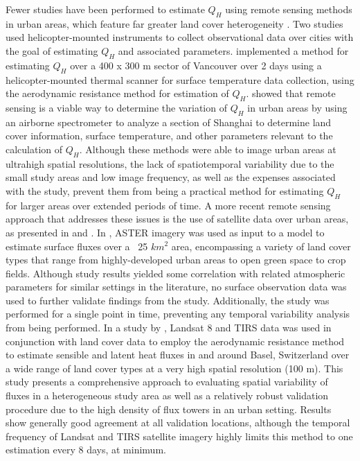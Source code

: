 Fewer studies have been performed to estimate $Q_H$ using remote sensing methods in urban areas, which feature far greater land cover heterogeneity \citep{Feigenwinter_2018, Liu_2012, Voogt_2000, Xu_2008}. Two studies \citep{Voogt_2000, Xu_2008} used helicopter-mounted instruments to collect observational data over cities with the goal of estimating $Q_H$ and associated parameters. \citet{Voogt_2000} implemented a method for estimating $Q_H$ over a 400 x 300 m sector of Vancouver over 2 days using a helicopter-mounted thermal scanner for surface temperature data collection, using the aerodynamic resistance method for estimation of $Q_H$.  \citet{Xu_2008} showed that remote sensing is a viable way to determine the variation of $Q_H$ in urban areas by using an airborne spectrometer to analyze a section of Shanghai to determine land cover information, surface temperature, and other parameters relevant to the calculation of $Q_H$.  Although these methods were able to image urban areas at ultrahigh spatial resolutions, the lack of spatiotemporal variability due to the small study areas and low image frequency, as well as the expenses associated with the study, prevent them from being a practical method for estimating $Q_H$ for larger areas over extended periods of time.  A more recent remote sensing approach that addresses these issues is the use of satellite data over urban areas, as presented in \citet{Feigenwinter_2018} and \citet{Liu_2012}. In \citet{Liu_2012}, ASTER imagery was used as input to a model to estimate surface fluxes over a ~25 $km^2$ area, encompassing a variety of land cover types that range from highly-developed urban areas to open green space to crop fields. Although study results yielded some correlation with related atmospheric parameters for similar settings in the literature, no surface observation data was used to further validate findings from the study. Additionally, the study was performed for a single point in time, preventing any temporal variability analysis from being performed.  In a study by \citet{Feigenwinter_2018}, Landsat 8 and TIRS data was used in conjunction with land cover data to employ the aerodynamic resistance method to estimate sensible and latent heat fluxes in and around Basel, Switzerland over a wide range of land cover types at a very high spatial resolution (100 m).  This study presents a comprehensive approach to evaluating spatial variability of fluxes in a heterogeneous study area as well as a relatively robust validation procedure due to the high density of flux towers in an urban setting. Results show generally good agreement at all validation locations, although the temporal frequency of Landsat and TIRS satellite imagery highly limits this method to one estimation every 8 days, at minimum.

